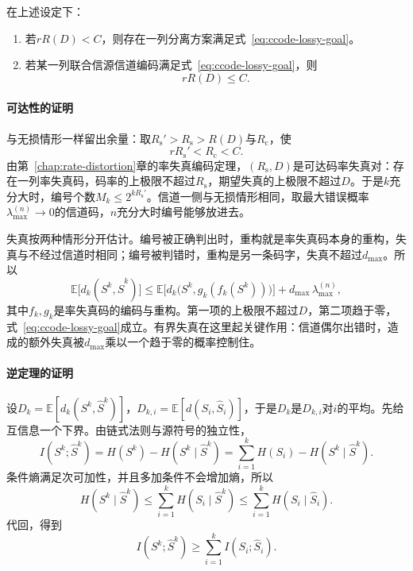 \begin{theorem}[有损传输的分离定理]
\label{thm:ccode-lossy-separation}
在上述设定下：
\begin{enumerate}
 \item 若$rR(D)<C$，则存在一列分离方案满足式~\eqref{eq:ccode-lossy-goal}。
 \item 若某一列联合信源信道编码满足式~\eqref{eq:ccode-lossy-goal}，则
 \begin{equation}
  rR(D)\leq C .
  \label{eq:ccode-lossy-converse}
 \end{equation}
\end{enumerate}
\end{theorem}

\paragraph{可达性的证明}
与无损情形一样留出余量：取$R_{\mathrm{s}}'>R_{\mathrm{s}}>R(D)$与$R_{\mathrm{c}}$，使
\[
 rR_{\mathrm{s}}'<R_{\mathrm{c}}<C .
\]
由第~\ref{chap:rate-distortion}章的率失真编码定理，$(R_{\mathrm{s}},D)$是可达码率失真对：存在一列率失真码，码率的上极限不超过$R_{\mathrm{s}}$，期望失真的上极限不超过$D$。于是$k$充分大时，编号个数$M_k\leq2^{kR_{\mathrm{s}}'}$。信道一侧与无损情形相同，取最大错误概率$\lambda_{\max}^{(n)}\to0$的信道码，$n$充分大时编号能够放进去。

失真按两种情形分开估计。编号被正确判出时，重构就是率失真码本身的重构，失真与不经过信道时相同；编号被判错时，重构是另一条码字，失真不超过$d_{\max}$。所以
\[
 \mathbb{E}\bigl[d_k(S^{k},\hat{S}^{k})\bigr]\leq\mathbb{E}\bigl[d_k\bigl(S^{k},g_k(f_k(S^{k}))\bigr)\bigr]+d_{\max}\,\lambda_{\max}^{(n)} ,
\]
其中$f_k,g_k$是率失真码的编码与重构。第一项的上极限不超过$D$，第二项趋于零，式~\eqref{eq:ccode-lossy-goal}成立。有界失真在这里起关键作用：信道偶尔出错时，造成的额外失真被$d_{\max}$乘以一个趋于零的概率控制住。

\paragraph{逆定理的证明}
设$D_k=\mathbb{E}[d_k(S^{k},\hat{S}^{k})]$，$D_{k,i}=\mathbb{E}[d(S_i,\hat{S}_i)]$，于是$D_k$是$D_{k,i}$对$i$的平均。先给互信息一个下界。由链式法则与源符号的独立性，
\[
 I(S^{k};\hat{S}^{k})=H(S^{k})-H(S^{k}\mid\hat{S}^{k})=\sum_{i=1}^{k}H(S_i)-H(S^{k}\mid\hat{S}^{k}) .
\]
条件熵满足次可加性，并且多加条件不会增加熵，所以
\[
 H(S^{k}\mid\hat{S}^{k})\leq\sum_{i=1}^{k}H(S_i\mid\hat{S}^{k})\leq\sum_{i=1}^{k}H(S_i\mid\hat{S}_i) .
\]
代回，得到
\[
 I(S^{k};\hat{S}^{k})\geq\sum_{i=1}^{k}I(S_i;\hat{S}_i) .
\]

